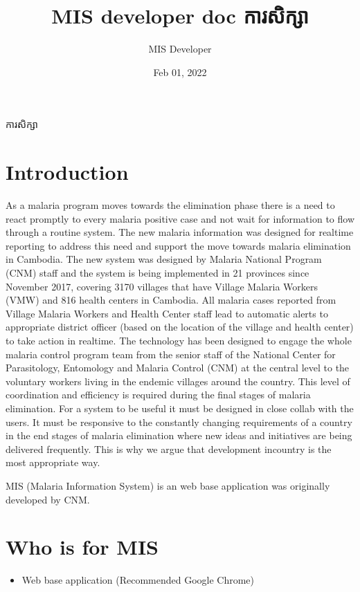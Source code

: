 \documentclass[letterpaper,10pt,english,openany,oneside]{sphinxmanual}
\title{MIS developer doc ការសិក្សា}
\date{Feb 01, 2022}
\author{MIS Developer}
\let\sphinxpxdimen\pdfpxdimen\else\newdimen\sphinxpxdimen
\begin{document}
	ការសិក្សា
\pagestyle{empty}
\sphinxmaketitle
\pagestyle{plain}
\sphinxtableofcontents
\pagestyle{normal}
\label{\detokenize{index::doc}}



\chapter{Introduction}
\label{\detokenize{about/about-mis:introduction}}\label{\detokenize{about/about-mis::doc}}
\noindent{\hspace*{\fill}\sphinxincludegraphics[width=100\sphinxpxdimen]{{cnm}.png}\hspace*{\fill}}

\sphinxAtStartPar
As a malaria program moves towards the elimination phase there is a need to react promptly to every malaria positive case and not wait for information to flow through a routine system. The new malaria information was designed for real\sphinxhyphen{}time reporting to address this need and support the move towards malaria elimination in Cambodia.
The new system was designed by Malaria National Program (CNM) staff and the system is being implemented in 21 provinces since November 2017, covering 3170 villages that have Village Malaria Workers (VMW) and 816 health centers in Cambodia. All malaria cases reported from Village Malaria Workers and Health Center staff lead to automatic alerts to appropriate district officer (based on the location of the village and health center) to take action in real\sphinxhyphen{}time.
The technology has been designed to engage the whole malaria control program team from the senior staff of the National Center for Parasitology, Entomology and Malaria Control (CNM) at the central level to the voluntary workers living in the endemic villages around the country. This level of coordination and efficiency is required during the final stages of malaria elimination.
For a system to be useful it must be designed in close collab with the users. It must be responsive to the constantly changing requirements of a country in the end stages of malaria elimination where new ideas and initiatives are being delivered frequently. This is why we argue that development in\sphinxhyphen{}country is the most appropriate way.

\sphinxAtStartPar
MIS (Malaria Information System) is an web base application was originally developed by CNM.


\chapter{Who is for MIS}
\label{\detokenize{about/about-mis:who-is-for-mis}}\begin{itemize}
\item {} 
\sphinxAtStartPar
Web base application (Recommended Google Chrome)

\end{itemize}
\end{document}
